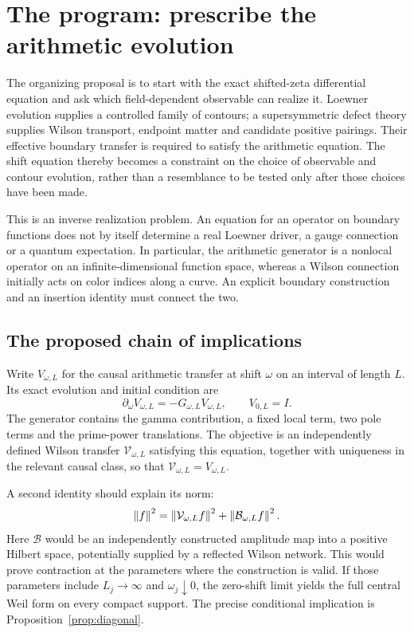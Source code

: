 \section{The program: prescribe the arithmetic evolution}\label{sec:intro}

The organizing proposal is to start with the exact shifted-zeta
differential equation and ask which field-dependent observable can
realize it. Loewner evolution supplies a controlled family of
contours; a supersymmetric defect theory supplies Wilson transport,
endpoint matter and candidate positive pairings. Their effective
boundary transfer is required to satisfy the arithmetic equation.
The shift equation thereby becomes a constraint on the choice of
observable and contour evolution, rather than a resemblance to be
tested only after those choices have been made.

This is an inverse realization problem. An equation for an operator
on boundary functions does not by itself determine a real Loewner
driver, a gauge connection or a quantum expectation. In particular,
the arithmetic generator is a nonlocal operator on an
infinite-dimensional function space, whereas a Wilson connection
initially acts on color indices along a curve. An explicit boundary
construction and an insertion identity must connect the two.

\subsection{The proposed chain of implications}

Write $V_{\omega,L}$ for the causal arithmetic transfer at shift
$\omega$ on an interval of length $L$. Its exact evolution and initial
condition are
\[
 \partial_\omega V_{\omega,L}=-G_{\omega,L}V_{\omega,L},
 \qquad V_{0,L}=I.
\]
The generator contains the gamma contribution, a fixed local term,
two pole terms and the prime-power translations. The objective is an
independently defined Wilson transfer $\mathcal V_{\omega,L}$
satisfying this equation, together with uniqueness in the relevant
causal class, so that $\mathcal V_{\omega,L}=V_{\omega,L}$.

A second identity should explain its norm:
\[
 \left\lVert f\right\rVert^2=\left\lVert\mathcal V_{\omega,L}f\right\rVert^2+
                 \left\lVert\mathcal B_{\omega,L}f\right\rVert^2.
\]
Here $\mathcal B$ would be an independently constructed amplitude
map into a positive Hilbert space, potentially supplied by a
reflected Wilson network. This would prove contraction at the
parameters where the construction is valid. If those parameters
include $L_j\to\infty$ and $\omega_j\downarrow0$, the zero-shift
limit yields the full central Weil form on every compact support.
The precise conditional implication is
Proposition~\ref{prop:diagonal}.

